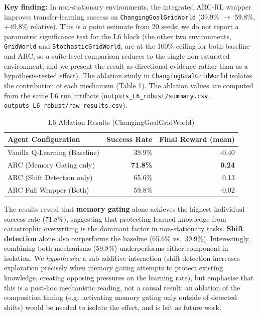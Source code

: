 \documentclass{article}
\begin{document}
\textbf{Key finding:} In non-stationary environments, the integrated ARC-RL wrapper improves transfer-learning success on \texttt{ChangingGoalGridWorld} (39.9\% $\rightarrow$ 59.8\%, $+49.8\%$ relative). This is a point estimate from 20 seeds; we do not report a parametric significance test for the L6 block (the other two environments, \texttt{GridWorld} and \texttt{StochasticGridWorld}, are at the 100\% ceiling for both baseline and ARC, so a suite-level comparison reduces to the single non-saturated environment, and we present the result as directional evidence rather than as a hypothesis-tested effect). The ablation study in \texttt{ChangingGoalGridWorld} isolates the contribution of each mechanism (Table \ref{tab:l6_ablation}).
The ablation values are computed from the same L6 run artifacts (\texttt{outputs\_L6\_robust/summary.csv}, \texttt{outputs\_L6\_robust/raw\_results.csv}).

\begin{table}[htbp]
\centering
\footnotesize
\caption{L6 Ablation Results (ChangingGoalGridWorld)}
\label{tab:l6_ablation}
\begin{tabular}{lrr}
    \toprule
    Agent Configuration & Success Rate & Final Reward (mean) \\
    \midrule
    Vanilla Q-Learning (Baseline) & 39.9\% & -0.40 \\
    ARC (Memory Gating only) & \textbf{71.8\%} & \textbf{0.24} \\
    ARC (Shift Detection only) & 65.6\% & 0.13 \\
    ARC Full Wrapper (Both) & 59.8\% & -0.02 \\
    \bottomrule
\end{tabular}
\end{table}

The results reveal that \textbf{memory gating} alone achieves the highest individual success rate (71.8\%), suggesting that protecting learned knowledge from catastrophic overwriting is the dominant factor in non-stationary tasks. \textbf{Shift detection} alone also outperforms the baseline (65.6\% vs.\ 39.9\%). Interestingly, combining both mechanisms (59.8\%) underperforms either component in isolation. We \emph{hypothesize} a sub-additive interaction (shift detection increases exploration precisely when memory gating attempts to protect existing knowledge, creating opposing pressures on the learning rate), but emphasise that this is a post-hoc mechanistic reading, not a causal result: an ablation of the composition timing (e.g.\ activating memory gating only outside of detected shifts) would be needed to isolate the effect, and is left as future work.
\end{document}
